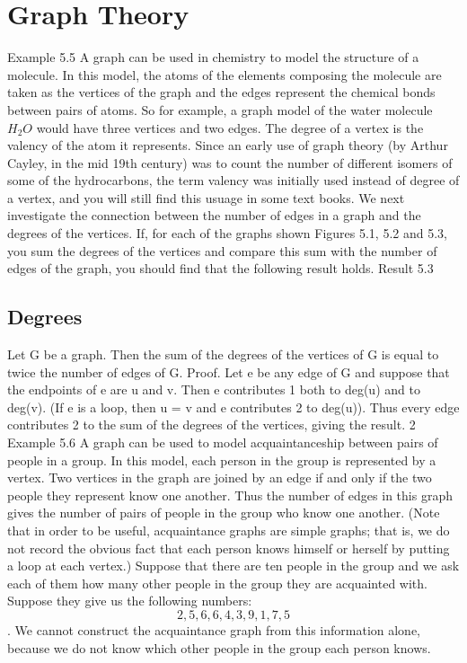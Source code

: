 \documentclass{article}
\begin{document}
\section{Graph Theory}
Example 5.5 A graph can be used in chemistry to model the structure of a molecule. In this
model, the atoms of the elements composing the molecule are taken as the vertices of the graph
and the edges represent the chemical bonds between pairs of atoms. So for example, a graph model
of the water molecule $H_2O$ would have three vertices and two edges. The degree of a vertex is the
valency of the atom it represents. 
Since an early use of graph theory (by Arthur Cayley, in the
mid 19th century) was to count the number of different isomers of some of the hydrocarbons, the
term valency was initially used instead of degree of a vertex, and you will still find this usuage in
some text books. 
We next investigate the connection between the number of edges in a graph and the degrees of
the vertices. If, for each of the graphs shown Figures 5.1, 5.2 and 5.3, you sum the degrees of the
vertices and compare this sum with the number of edges of the graph, you should find that the
following result holds.
Result 5.3 
\subsection*{Degrees}
Let G be a graph. Then the sum of the degrees of the vertices of G is equal to twice
the number of edges of G.
Proof. Let e be any edge of G and suppose that the endpoints of e are u and v. Then e contributes
1 both to deg(u) and to deg(v). (If e is a loop, then u = v and e contributes 2 to deg(u)). Thus
every edge contributes 2 to the sum of the degrees of the vertices, giving the result. 2
Example 5.6 A graph can be used to model acquaintanceship between pairs of people in a group.
In this model, each person in the group is represented by a vertex. Two vertices in the graph are
joined by an edge if and only if the two people they represent know one another. 
Thus the number of edges in this graph gives the number of pairs of people in the group who know one another.
(Note that in order to be useful, acquaintance graphs are simple graphs; that is, we do not record
the obvious fact that each person knows himself or herself by putting a loop at each vertex.)
Suppose that there are ten people in the group and we ask each of them how many other people
in the group they are acquainted with. Suppose they give us the following numbers:
\[2, 5, 6, 6, 4, 3, 9, 1, 7, 5\].
We cannot construct the acquaintance graph from this information alone, because we do not know
which other people in the group each person knows.
\end{document}
